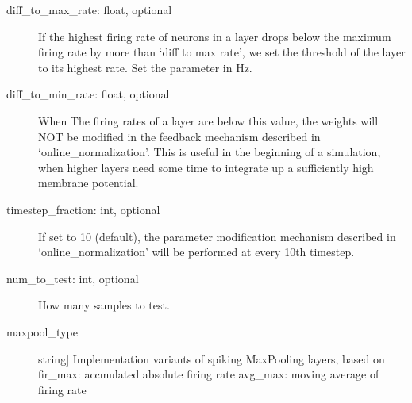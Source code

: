 \documentclass[letterpaper,10pt,english]{sphinxmanual}
\begin{document}
\begin{description}
\item[{diff\_to\_max\_rate: float, optional}] \leavevmode
If the highest firing rate of neurons in a layer drops below the maximum
firing rate by more than `diff to max rate', we set the threshold of the
layer to its highest rate. Set the parameter in Hz.

\item[{diff\_to\_min\_rate: float, optional}] \leavevmode
When The firing rates of a layer are below this value, the weights will NOT
be modified in the feedback mechanism described in `online\_normalization'.
This is useful in the beginning of a simulation, when higher layers need
some time to integrate up a sufficiently high membrane potential.

\item[{timestep\_fraction: int, optional}] \leavevmode
If set to 10 (default), the parameter modification mechanism described in
`online\_normalization' will be performed at every 10th timestep.

\item[{num\_to\_test: int, optional}] \leavevmode
How many samples to test.

\item[{maxpool\_type}] \leavevmode{[}string{]}
Implementation variants of spiking MaxPooling layers, based on
fir\_max: accmulated absolute firing rate
avg\_max: moving average of firing rate

\end{description}
\end{document}
